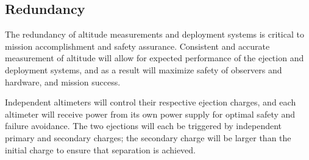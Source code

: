    

    \subsection{Redundancy}
The redundancy of altitude measurements and deployment systems is critical to mission accomplishment and safety assurance. Consistent and accurate measurement of altitude will allow for expected performance of the ejection and deployment systems, and as a result will maximize safety of observers and hardware, and mission success.

Independent altimeters will control their respective ejection charges, and each altimeter will receive power from its own power supply for optimal safety and failure avoidance. The two ejections will each be triggered by independent primary and secondary charges; the secondary charge will be larger than the initial charge to ensure that separation is achieved. 
